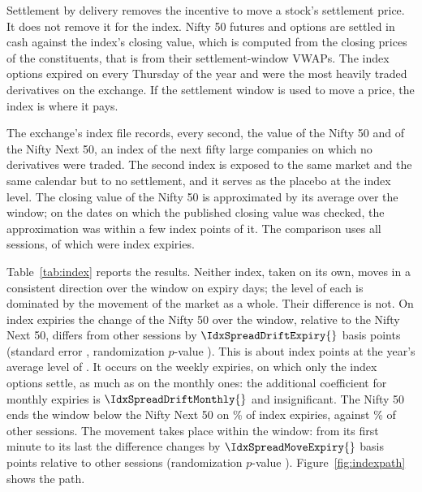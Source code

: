 Settlement by delivery removes the incentive to move a stock's settlement price. It does not
remove it for the index. Nifty 50 futures and options are settled in cash against the index's closing value, which is computed from the
closing prices of the constituents, that is from their settlement-window VWAPs. The index
options expired on every Thursday of the year and were the most heavily traded derivatives on
the exchange. If the settlement window is used to move a price, the index is where it pays.

The exchange's index file records, every second, the value of the Nifty 50 and of the 
 Nifty Next 50, an index of the next fifty large companies on which no derivatives were traded. The
second index is exposed to the same market and the same calendar but to no settlement, and it
serves as the placebo at the index level. The closing value of the Nifty 50 is approximated by
its average over the window; on the dates on which the published closing value was checked,
the approximation was within a few index points of it. The comparison uses all
\IdxSessions{} sessions, of which \IdxExpiries{} were index expiries.

\begin{table}[htbp]
\centering
\small
\caption{The index settlement. Regressions of each measure on indicators for index expiries,
every Thursday on which the index options expire, and for the monthly expiry in addition,
with a control for month ends. Difference is the Nifty 50 less the Nifty Next 50, which has no
derivatives. Heteroskedasticity-robust standard errors in parentheses. The randomization
$p$-value compares the index-expiry coefficient with its distribution over \RiDraws{} samples
in which each expiry is replaced by another session of the same week.}
\label{tab:index}
\resizebox{0.95\textwidth}{!}{}
\end{table}

Table~\ref{tab:index} reports the results. Neither index, taken on its own, moves in a
consistent direction over the window on expiry days; the level of each is dominated by the
movement of the market as a whole. Their difference is not. On index expiries the change of the
Nifty 50 over the window, relative to the Nifty Next 50, differs from other sessions by $\IdxSpreadDriftExpiry{}$ basis points (standard error \IdxSpreadDriftExpirySe{}, randomization $p$-value
\IdxSpreadDriftExpiryRip{}). This is about \IdxSpreadDriftPoints{} index points at the year's
average level of \IdxNiftyLevel{}. It occurs on the weekly expiries, on which only the index
options settle, as much as on the monthly ones: the additional coefficient for monthly expiries
is $\IdxSpreadDriftMonthly{}$ and insignificant. The Nifty 50 ends the window below the 
 Nifty Next 50 on \IdxNegshareExpiry{}\% of index expiries, against \IdxNegshareOther{}\% of other
sessions. The movement takes place within the window: from its first minute to its last the
difference changes by $\IdxSpreadMoveExpiry{}$ basis points relative to other sessions
(randomization $p$-value \IdxSpreadMoveExpiryRip{}). Figure~\ref{fig:indexpath} shows the path.

